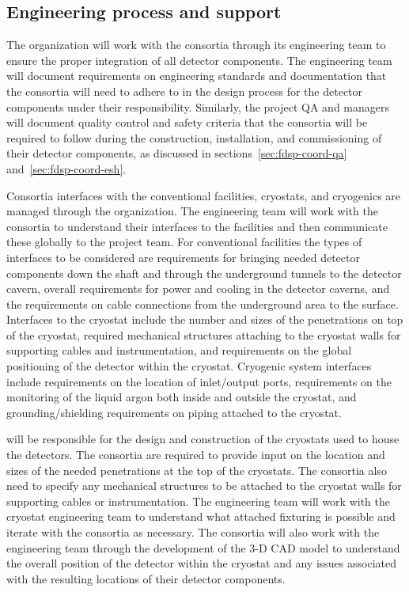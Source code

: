 \subsection{Engineering process and support}
\label{sec:fdsp-coord-integ-engr-proc}
 

The   organization will work with
the consortia through its  engineering team to ensure the proper
integration of all detector components.  The  engineering team will
document requirements on engineering standards and documentation that
the consortia will need to adhere to in the design process for the
detector components under their responsibility.  Similarly, the
project QA and  managers will document quality control and safety
criteria that the consortia will be required to follow during the
construction, installation, and commissioning of their detector
components, as discussed in sections~\ref{sec:fdsp-coord-qa}
and~\ref{sec:fdsp-coord-esh}.


Consortia interfaces with the conventional facilities, cryostats, and
cryogenics are managed through the  
organization.  The  engineering team will work with the
consortia to understand their interfaces to the facilities and then
communicate these globally to the  project team.  For conventional
facilities the types of interfaces to be considered are requirements
for bringing needed detector components down the shaft and through the
underground tunnels to the detector cavern, overall requirements for
power and cooling in the detector caverns, and the requirements on
cable connections from the underground area to the surface.
Interfaces to the cryostat include the number and sizes of the
penetrations on top of the cryostat, required mechanical structures
attaching to the cryostat walls for supporting cables and
instrumentation, and requirements on the global positioning of the
detector within the cryostat.  Cryogenic system interfaces include
requirements on the location of inlet/output ports, requirements on
the monitoring of the liquid argon both inside and outside the
cryostat, and grounding/shielding requirements on piping attached to
the cryostat.

 will be responsible for the design and construction of the
cryostats used to house the detectors.  The consortia are required to
provide input on the location and sizes of the needed penetrations at
the top of the cryostats.  The consortia also need to specify any
mechanical structures to be attached to the cryostat walls for
supporting cables or instrumentation.  The  engineering
team will work with the  cryostat engineering team to understand
what attached fixturing is possible and iterate with the consortia as
necessary.  The consortia will also work with the  engineering
team through the development of the 3-D CAD model to understand the
overall position of the detector within the cryostat and any issues
associated with the resulting locations of their detector components.

